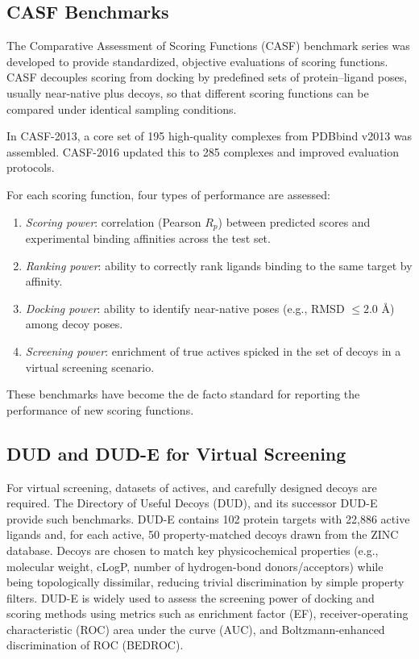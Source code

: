 \documentclass[12pt]{article}
\begin{document}
\subsection{CASF Benchmarks}

The Comparative Assessment of Scoring Functions (CASF) benchmark series was developed to provide standardized, objective evaluations of scoring functions.\cite{CH3_Wang2014_CASF2013_Set,CH3_Wang2014_CASF2013_Results,CH3_Su2019_CASF2016} CASF decouples scoring from docking by predefined sets of protein--ligand poses, usually near-native plus decoys, so that different scoring functions can be compared under identical sampling conditions.

In CASF-2013, a core set of 195 high-quality complexes from PDBbind v2013 was assembled.\cite{CH3_Wang2014_CASF2013_Set} CASF-2016 updated this to 285 complexes and improved evaluation protocols.\cite{CH3_Su2019_CASF2016}

For each scoring function, four types of performance are assessed:
\begin{enumerate}
    \item \textit{Scoring power}: correlation (Pearson $R_p$) between predicted scores and experimental binding affinities across the test set.
    \item \textit{Ranking power}: ability to correctly rank ligands binding to the same target by affinity.
    \item \textit{Docking power}: ability to identify near-native poses (e.g., RMSD $\leq 2.0$ \r{A}) among decoy poses.
    \item \textit{Screening power}: enrichment of true actives spicked in the set of decoys in a virtual screening scenario.
\end{enumerate}

These benchmarks have become the de facto standard for reporting the performance of new scoring functions.

\subsection{DUD and DUD-E for Virtual Screening}

For virtual screening, datasets of actives, and carefully designed decoys are required. The Directory of Useful Decoys (DUD), and its successor DUD-E provide such benchmarks.\cite{CH3_Mysinger2012_DUDE} DUD-E contains 102 protein targets with 22,886 active ligands and, for each active, 50 property-matched decoys drawn from the ZINC database. Decoys are chosen to match key physicochemical properties (e.g., molecular weight, cLogP, number of hydrogen-bond donors/acceptors) while being topologically dissimilar, reducing trivial discrimination by simple property filters. DUD-E is widely used to assess the screening power of docking and scoring methods using metrics such as enrichment factor (EF), receiver-operating characteristic (ROC) area under the curve (AUC), and Boltzmann-enhanced discrimination of ROC (BEDROC).
\end{document}
